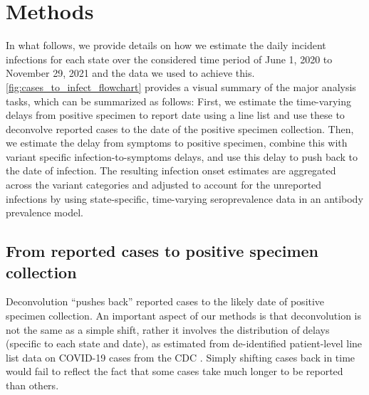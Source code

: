 \section{Methods}
\label{sec:methods}


In what follows, we provide details on how we estimate the daily incident
infections for each state over the considered time period of June 1, 2020 to
November 29, 2021 and the data we used to achieve this.
\autoref{fig:cases_to_infect_flowchart} provides a visual summary of the major
analysis tasks, which can be summarized as follows: First, we estimate the time-varying
delays from positive specimen to report date using a line list and use these
to deconvolve reported cases to the date of the positive specimen collection.
Then, we estimate the delay from symptoms to positive specimen, 
combine this with variant specific
infection-to-symptoms delays, and use this delay to push back to the date
of infection. The resulting infection onset estimates are aggregated
across the variant categories and adjusted to account for the unreported
infections by using state-specific, time-varying seroprevalence data in an
antibody prevalence model. 

\subsection{From reported cases to positive specimen collection}
\label{sec:step1}

Deconvolution ``pushes back'' reported cases to the likely date of positive
specimen collection. An important aspect of our methods is that deconvolution is
not the same as a simple shift, rather it involves the distribution of delays
(specific to each state and date), as estimated from de-identified patient-level
line list data on COVID-19 cases from the CDC \citep{cdc2020caserestr}. Simply
shifting cases back in time would fail to reflect the fact that some cases take
much longer to be reported than others.

